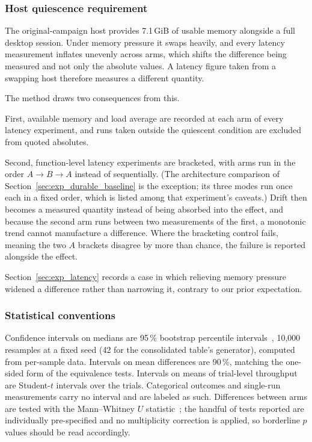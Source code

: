 \documentclass[preprint,12pt]{elsarticle}
\begin{document}
\subsubsection*{Host quiescence requirement}

The original-campaign host provides 7.1\,GiB of usable memory alongside a full
desktop session. Under memory pressure it swaps heavily, and every latency
measurement inflates unevenly across arms, which shifts the difference being
measured and not only the absolute values. A latency figure taken from a
swapping host therefore measures a different quantity.

The method draws two consequences from this.

First, available memory and load average are recorded at each arm of every
latency experiment, and runs taken outside the quiescent condition are excluded
from quoted absolutes.

Second, function-level latency experiments are bracketed, with arms run in
the order $A \rightarrow B \rightarrow A$ instead of sequentially. (The
architecture comparison of Section~\ref{sec:exp_durable_baseline} is the
exception; its three modes run once each in a fixed order, which is listed
among that experiment's caveats.) Drift then becomes a
measured quantity instead of being absorbed into the effect, and because the
second arm runs between two measurements of the first, a monotonic trend cannot
manufacture a difference. Where the bracketing control fails, meaning the two
$A$ brackets disagree by more than chance, the failure is reported alongside
the effect.

Section~\ref{sec:exp_latency} records a case in which relieving memory
pressure widened a difference rather than narrowing it, contrary to our prior
expectation.

\subsubsection*{Statistical conventions}

Confidence intervals on medians are 95\,\% bootstrap percentile
intervals~\cite{efron1993bootstrap}, 10{,}000 resamples at a fixed seed
(42 for the consolidated table's generator), computed from per-sample data.
Intervals on mean differences are 90\,\%, matching the one-sided form of
the equivalence tests. Intervals on means of
trial-level throughput are Student-$t$ intervals over the trials. Categorical
outcomes and single-run measurements carry no interval and are labeled as
such. Differences between arms are tested with the
Mann--Whitney $U$ statistic~\cite{mannwhitney1947}; the handful of tests
reported are individually pre-specified and no multiplicity correction is
applied, so borderline $p$ values should be read accordingly.
\end{document}

